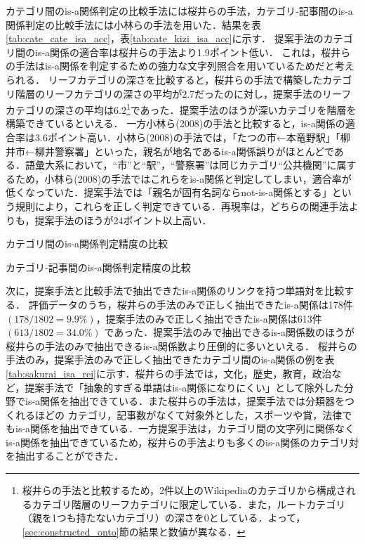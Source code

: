 \documentclass[japanese]{jnlp_1.4}
\begin{document}
カテゴリ間のis-a関係判定の比較手法には桜井ら\citeyear{Sakurai}の手法，カテゴリ‐記事間のis-a関係判定の比較手法には小林ら\citeyear{Kobayashi}の手法を用いた．結果を表\ref{tab:cate_cate_isa_acc}，表\ref{tab:cate_kizi_isa_acc}に示す．
提案手法のカテゴリ間のis-a関係の適合率は桜井らの手法より1.9ポイント低い．
これは，桜井らの手法はis-a関係を判定するための強力な文字列照合を用いているためだと考えられる．
リーフカテゴリの深さを比較すると，桜井らの手法で構築したカテゴリ階層のリーフカテゴリの深さの平均が2.7だったのに対し，提案手法のリーフカテゴリの深さの平均は6.2\footnote{桜井らの手法と比較するため，2件以上のWikipediaのカテゴリから構成されるカテゴリ階層のリーフカテゴリに限定している．また，ルートカテゴリ（親を1つも持たないカテゴリ）の深さを0としている．よって，\ref{sec:constructed_onto}節の結果と数値が異なる．}であった．提案手法のほうが深いカテゴリを階層を構築できているといえる．
一方小林ら(2008)の手法と比較すると，is-a関係の適合率は3.6ポイント高い．小林ら(2008)の手法では，「たつの市←本竜野駅」「柳井市←柳井警察署」といった，親名が地名であるis-a関係誤りがほとんどである．語彙大系において，``市''と``駅''，``警察署''は同じカテゴリ``公共機関''に属するため，小林ら(2008)の手法ではこれらをis-a関係と判定してしまい，適合率が低くなっていた．提案手法では「親名が固有名詞ならnot-is-a関係とする」という規則により，これらを正しく判定できている．再現率は，どちらの関連手法よりも，提案手法のほうが24ポイント以上高い．

\begin{table}[t]
\caption{カテゴリ間のis-a関係判定精度の比較}
\label{tab:cate_cate_isa_acc}

\end{table}
\begin{table}[t]
\caption{カテゴリ‐記事間のis-a関係判定精度の比較}
\label{tab:cate_kizi_isa_acc}

\end{table}

次に，提案手法と比較手法で抽出できたis-a関係のリンクを持つ単語対を比較する．
評価データのうち，桜井らの手法のみで正しく抽出できたis-a関係は178件 $(178/1802=9.9\%)$，提案手法のみで正しく抽出できたis-a関係は613件 $(613/1802=34.0\%)$ であった．提案手法のみで抽出できるis-a関係数のほうが桜井らの手法のみで抽出できるis-a関係数より圧倒的に多いといえる．
桜井らの手法のみ，提案手法のみで正しく抽出できたカテゴリ間のis-a関係の例を表\ref{tab:sakurai_isa_rei}に示す．桜井らの手法では，文化，歴史，教育，政治など，提案手法で「抽象的すぎる単語はis-a関係になりにくい」として除外した分野でis-a関係を抽出できている．また桜井らの手法は，提案手法では分類器をつくれるほどの
カテゴリ，記事数がなくて対象外とした，スポーツや賞，法律でもis-a関係を抽出できている．一方提案手法は，カテゴリ間の文字列に関係なくis-a関係を抽出できているため，桜井らの手法よりも多くのis-a関係のカテゴリ対を抽出することができた．
\end{document}
